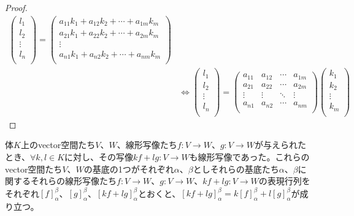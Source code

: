 \documentclass[dvipdfmx]{jsarticle}
\begin{document}
\begin{proof}
\begin{align*}
\begin{pmatrix}
l_{1} \\
l_{2} \\
 \vdots \\
l_{n} \\
\end{pmatrix} = \begin{pmatrix}
a_{11}k_{1} + a_{12}k_{2} + \cdots + a_{1m}k_{m} \\
a_{21}k_{1} + a_{22}k_{2} + \cdots + a_{2m}k_{m} \\
 \vdots \\
a_{n1}k_{1} + a_{n2}k_{2} + \cdots + a_{nm}k_{m} \\
\end{pmatrix}\\
&\Leftrightarrow \begin{pmatrix}
l_{1} \\
l_{2} \\
 \vdots \\
l_{n} \\
\end{pmatrix} = \begin{pmatrix}
a_{11} & a_{12} & \cdots & a_{1m} \\
a_{21} & a_{22} & \cdots & a_{2m} \\
 \vdots & \vdots & \ddots & \vdots \\
a_{n1} & a_{n2} & \cdots & a_{nm} \\
\end{pmatrix}\begin{pmatrix}
k_{1} \\
k_{2} \\
 \vdots \\
k_{m} \\
\end{pmatrix}
\end{align*}
\end{proof}
\begin{thm}
\label{2.1.5.6}
体$K$上のvector空間たち$V$、$W$、線形写像たち$f:V \rightarrow W$、$g:V \rightarrow W$が与えられたとき、$\forall k,l \in K$に対し、その写像$kf + lg:V \rightarrow W$も線形写像であった。これらのvector空間たち$V$、$W$の基底の1つがそれぞれ$\alpha$、$\beta$としそれらの基底たち$\alpha$、$\beta$に関するそれらの線形写像たち$f:V \rightarrow W$、$g:V \rightarrow W$、$kf + lg:V \rightarrow W$の表現行列をそれぞれ$[ f]^{\beta}_{\alpha}$、$[ g]^{\beta}_{\alpha}$、$[ kf + lg]^{\beta}_{\alpha}$とおくと、$[ kf + lg]^{\beta}_{\alpha} = k[ f]^{\beta}_{\alpha} + l[ g]^{\beta}_{\alpha}$が成り立つ。
\end{thm}
\end{document}
